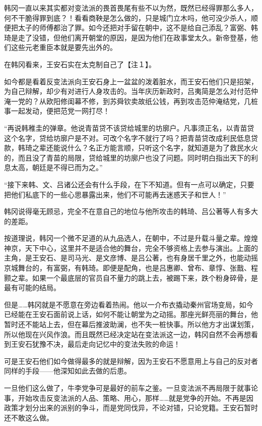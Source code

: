 韩冈一直以来其实都对变法派的畏首畏尾有些不以为然，既然已经得罪那么多人，何不干脆得罪到底？！看看商鞅是怎么做的，只是城门立木吗，他可没少杀人，顺便把太子的师傅都治了罪。如今还把对手留在朝中，这不是给自己添乱？富弼、韩琦是走了没错，但他们离开朝堂的原因，是因为他们在政事堂太久。新帝登基，他们这些元老重臣本就是要先出外的。

在韩冈看来，王安石实在太克制自己了【注１】。

如今都是看着反变法派向王安石身上一盆盆的泼着脏水，而王安石他们只是招架，为自己辩解，却少有对进行人身攻击的。当年庆历新政时，吕夷简是怎么对付范仲淹一党的？从欧阳修闺幕不修，到苏舜钦卖故纸公钱，再到攻击范仲淹结党，几桩事一起发动，便把范党一网打尽！

“再说韩稚圭的弹章。他说青苗贷不该贷给城里的坊廓户。凡事须正名，以青苗贷这个名字，贷给坊廓户是不对。可改个名字不就行了吗？把青苗贷改成利民低息贷款，韩琦之辈还能说什么？名正方能言顺，只听这个名字，就知道是为了救民水火的，而且没了青苗的局限，贷给城里的坊廓户也没了问题。同时明白指出天下的利息太高，朝廷是不得已而为之。”

“接下来韩、文、吕诸公还会有什么手段，在下不知道。但有一点可以确定，只要把他们私底下的一些心思暴露出来，他们不可能再去迷惑天子和世人！”

韩冈说得毫无顾忌，完全不在意自己的地位与他所攻击的韩琦、吕公著等人有多大的差距。

按道理说，韩冈一个微不足道的从九品选人，在朝中，不过是升载斗量之辈。煌煌神京，天下中心，这里并不是适合他的舞台，完全不够资格上去参与演出。上面的主角，是王安石、是司马光、是文彦博、是吕公著，也有身居千里之外，也能动摇京城舞台的，有富弼，有韩琦。即便是配角，也是吕惠卿、曾布、章惇、张戬、程颢之辈。如果一个最底层的官员自不量力的跳上去，被踢下来，跌个粉身碎骨，是最有可能的结局。

但是……韩冈就是不愿意在旁边看着热闹。他以一介布衣撬动秦州官场变局，如今已经能在王安石面前说上话，如何不能让朝堂为之动摇。那座光鲜亮丽的舞台，他暂时还不能站上去，但在幕后推波助澜，也不失一桩快事。所以他方才出谋划策，所以他现在兴风作浪。而且既然已经决定站在变法派这一边，韩冈自然不会再想看到王安石犹豫不决，最后走向记忆中的变法失败的命运！

可是王安石他们如今做得最多的就是辩解，因为王安石不愿意用上与自己的反对者同样的手段——他深知如此去做的后患。

一旦他们这么做了，牛李党争可是最好的前车之鉴。一旦变法派不再局限于就事论事，开始攻击反变法派的人品、策略、用心，那样……就是党争的开始。不再是因政策才划分出来的派别的争斗，而是党同伐异，不论对错，只论党籍。王安石暂时还不敢这么做。

